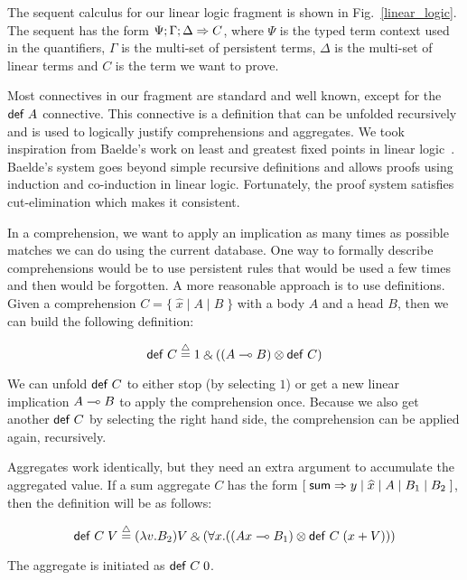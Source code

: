 The sequent calculus for our linear logic fragment is shown in Fig.~\ref{linear_logic}.
The sequent has the form $\Psi ; \Gamma ; \Delta \Rightarrow C$, where $\Psi$ is the typed
term context used in the quantifiers, $\Gamma$ is the multi-set of persistent terms, $\Delta$
is the multi-set of linear terms and $C$ is the term we want to prove.

Most connectives in our fragment are standard and well known, except for the $\mathsf{def} \; A$ connective. This
connective is a definition that can be unfolded recursively and is used to logically justify
comprehensions and aggregates. We took inspiration from Baelde's work on least and greatest fixed points
in linear logic~\cite{Baelde:2012:LGF:2071368.2071370}. Baelde's system goes beyond simple recursive
definitions and allows proofs using induction and co-induction in linear logic. Fortunately,
the proof system satisfies cut-elimination which makes it consistent. 

In a comprehension, we want to apply an implication as many times as possible matches we can do
using the current database. One way to formally describe comprehensions would be to use persistent
rules that would be used a few times and then would be forgotten. A more reasonable approach is to use
definitions. Given a comprehension $C = \{ \; \widehat{x} \; | \; A \; | \; B \; \}$ with a body $A$ and a head $B$, then we can build the following definition:

\[
\compr{C} \defeq 1 \with ((A \lolli B) \otimes \compr{C})
\]

We can unfold $\mathsf{def} \; C$ to either stop (by selecting $1$) or get a new linear implication $A \multimap B$
to apply the comprehension once. Because we also get another $\mathsf{def} \; C$ by selecting the right hand side,
the comprehension can be applied again, recursively.

Aggregates work identically, but they need an extra argument to accumulate the aggregated value. If a sum aggregate $C$ has the form $[\;\mathsf{sum} \Rightarrow y \; | \; \widehat{x} \; | \; A \; | \; B_1 \; | \; B_2 \;]$, then the definition will be as follows:

\[
\compr{C} \; V \defeq (\lambda v. B_2)V \with (\forall x. ((Ax \lolli B_1) \otimes \compr{C} \; (x + V)))
\]

The aggregate is initiated as $\mathsf{def} \; C \; 0$.

